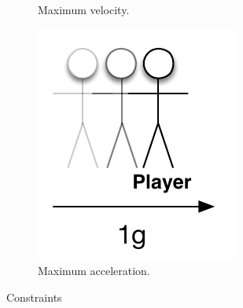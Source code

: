 \begin{figure}[h]
\begin{subfigure}[b]{0.45\textwidth}
		\caption{Maximum velocity.}
		\label{figure:maximum-velocity}
	\end{subfigure}
	\qquad
	\begin{subfigure}[b]{0.45\textwidth}
		\centering
		\includegraphics[scale = 0.45]{media/constraints/07-maximum-acceleration}
		\caption{Maximum acceleration.}
		\label{figure:maximum-gravitational-pull}
	\end{subfigure}		
	\caption{Constraints}
	\label{figure:constraints}
\end{figure}